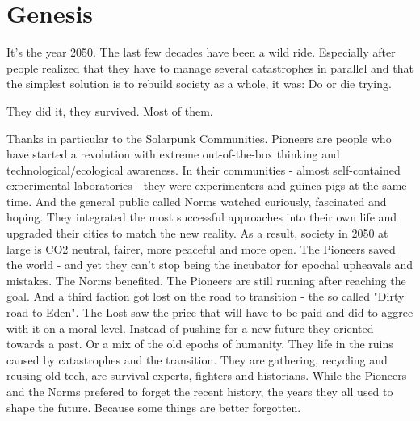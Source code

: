 \chapter{Genesis}

It's the year 2050. The last few decades have been a wild ride. Especially after people realized that they have to manage several catastrophes in parallel and that the simplest solution is to rebuild society as a whole, it was: Do or die trying.

They did it, they survived. Most of them.

Thanks in particular to the Solarpunk Communities. Pioneers are people who have started a revolution with extreme out-of-the-box thinking and technological/ecological awareness. In their communities - almost self-contained experimental laboratories - they were experimenters and guinea pigs at the same time. And the general public called Norms watched curiously, fascinated and hoping. They integrated the most successful approaches into their own life and upgraded their cities to match the new reality.
As a result, society in 2050 at large is CO2 neutral, fairer, more peaceful and more open.
The Pioneers saved the world - and yet they can't stop being the incubator for epochal upheavals and mistakes.
The Norms benefited. The Pioneers are still running after reaching the goal. And a third faction got lost on the road to transition - the so called "Dirty road to Eden". The Lost saw the price that will have to be paid and did to aggree with it on a moral level. Instead of pushing for a new future they oriented towards a past. Or a mix of the old epochs of humanity. They life in the ruins caused by catastrophes and the transition. They are gathering, recycling and reusing old tech, are survival experts, fighters and historians.
While the Pioneers and the Norms prefered to forget the recent history, the years they all used to shape the future. Because some things are better forgotten.